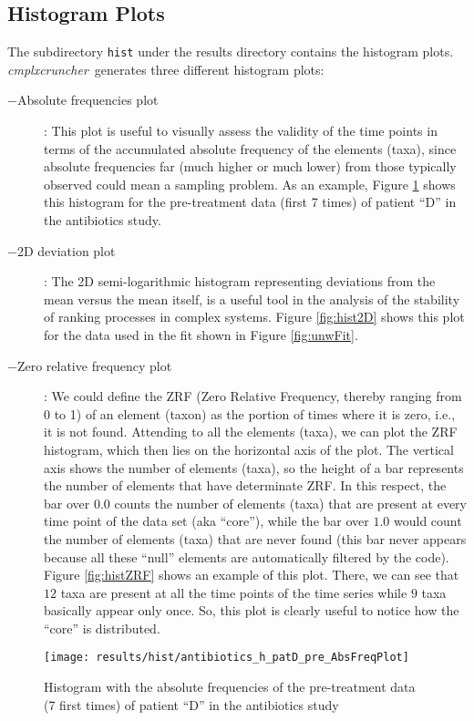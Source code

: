\documentclass[12pt]{article}
\newcommand{\CC}[0]{\emph{cmplxcruncher}}
\begin{document}
\subsection{Histogram Plots} 
The subdirectory \texttt{hist} under the results directory contains the histogram plots. \CC\ generates three different histogram plots:
\begin{description}
	\item[$-$Absolute frequencies plot]: This plot is useful to visually assess the validity of the time points in terms of the accumulated absolute frequency of the elements (taxa), since absolute frequencies far (much higher or much lower) from those typically observed could mean a sampling problem. As an example, Figure \ref{fig:histAFP} shows this histogram for the pre-treatment data (first 7 times) of patient ``D'' in the antibiotics study\cite{antibiotic}. 
	\item[$-$2D deviation plot]: The 2D semi-logarithmic histogram representing deviations from the mean versus the mean itself, is a useful tool in the analysis of the stability of ranking processes in complex systems\cite{ranking}. Figure \ref{fig:hist2D} shows this plot for the data used in the fit shown in Figure \ref{fig:unwFit}.
	\item[$-$Zero relative frequency plot]: We could define the ZRF (Zero Relative Frequency, thereby ranging from 0 to 1) of an element (taxon) as the portion of times where it is zero, i.e., it is not found. Attending to all the elements (taxa), we can plot the ZRF histogram, which then lies on the horizontal axis of the plot. The vertical axis shows the number of elements (taxa), so the height of a bar represents the number of elements that have determinate ZRF. In this respect, the bar over $0.0$ counts the number of elements (taxa) that are present at every time point of the data set (aka ``core''), while the bar over $1.0$ would count the number of elements (taxa) that are never found (this bar never appears because all these ``null'' elements are automatically filtered by the code). Figure \ref{fig:histZRF} shows an example of this plot. There, we can see that $12$ taxa are present at all the time points of the time series while $9$ taxa basically appear only once. So, this plot is clearly useful to notice how the ``core'' is distributed.
\end{description}

\begin{figure}
	\centering
	\texttt{[image: results/hist/antibiotics\_h\_patD\_pre\_AbsFreqPlot]}
	\caption{Histogram with the absolute frequencies of the pre-treatment data (7 first times) of patient ``D'' in the antibiotics study\cite{antibiotic}}
	\label{fig:histAFP}
\end{figure}
\end{document}
